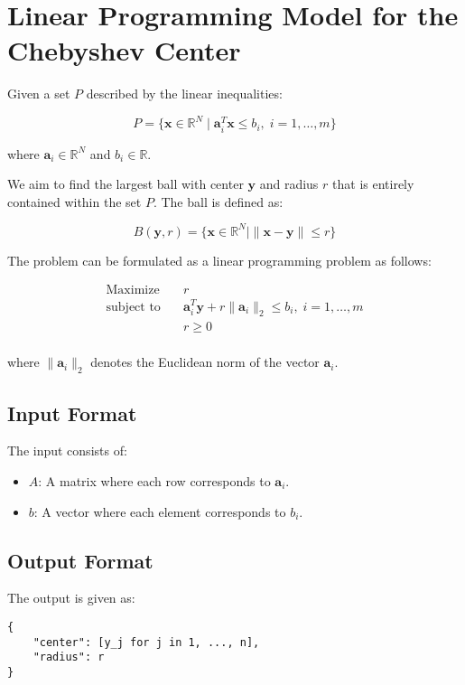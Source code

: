 \documentclass{article}
\begin{document}
\section*{Linear Programming Model for the Chebyshev Center}

Given a set \( P \) described by the linear inequalities:

\[
P = \{ \mathbf{x} \in \mathbb{R}^N \mid \mathbf{a}_i^T \mathbf{x} \leq b_i, \; i = 1, \ldots, m \}
\]

where \( \mathbf{a}_i \in \mathbb{R}^N \) and \( b_i \in \mathbb{R} \).

We aim to find the largest ball with center \( \mathbf{y} \) and radius \( r \) that is entirely contained within the set \( P \). The ball is defined as:

\[
B(\mathbf{y}, r) = \{ \mathbf{x} \in \mathbb{R}^N \mid \|\mathbf{x} - \mathbf{y}\| \leq r \}
\]

The problem can be formulated as a linear programming problem as follows:

\begin{align*}
\text{Maximize} \quad & r \\
\text{subject to} \quad & \mathbf{a}_i^T \mathbf{y} + r \|\mathbf{a}_i\|_2 \leq b_i, \; i = 1, \ldots, m \\
& r \geq 0 \\
\end{align*}

where \( \|\mathbf{a}_i\|_2 \) denotes the Euclidean norm of the vector \( \mathbf{a}_i \).

\subsection*{Input Format}

The input consists of:
\begin{itemize}
    \item \( A \): A matrix where each row corresponds to \( \mathbf{a}_i \).
    \item \( b \): A vector where each element corresponds to \( b_i \).
\end{itemize}

\subsection*{Output Format}

The output is given as:
\begin{verbatim}
{
    "center": [y_j for j in 1, ..., n],
    "radius": r
}
\end{verbatim}
\end{document}
